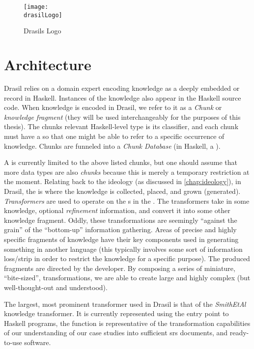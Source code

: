 \begin{figure}[H]
      \centering
      \caption{Drasils Logo}
      \label{fig:drasilLogo}
      \texttt{[image: \\drasilLogo]}
\end{figure}

\drasilPersonification

\section{Architecture}

Drasil relies on a domain expert encoding knowledge as a deeply embedded
 or record in Haskell. Instances of the knowledge also appear in the
Haskell source code. When knowledge is encoded in Drasil, we refer to it as a
\textit{Chunk} or \textit{knowledge fragment} (they will be used interchangeably
for the purposes of this thesis). The chunks relevant Haskell-level type is its
classifier, and each chunk must have a  so that one might be able to
refer to a specific occurrence of knowledge. Chunks are funneled into a
\textit{Chunk Database} (in Haskell, a \ChunkDB{}).


A \ChunkDB{} is currently limited to the above listed chunks, but one should assume that more data types are also
\textit{chunks} because this is merely a temporary restriction at the
moment. Relating back to the ideology (as discussed in
\autoref{chap:ideology}), in Drasil, the \ChunkDB{} is where the knowledge
is collected, placed, and grown (generated). \textit{Transformers} are
used to operate on the \Chunk{}s in the \ChunkDB{}. The transformers take
in some knowledge, optional \textit{refinement} information, and convert
it into some other knowledge fragment. Oddly, these transformations are seemingly ``against the grain'' of
the ``bottom-up'' information gathering. Areas of precise and
highly specific fragments of knowledge have their key components used in
generating something in another language (this typically involves some
sort of information loss/strip in order to restrict the knowledge for a
specific purpose). The produced fragments are directed by the developer.
By composing a series of miniature, ``bite-sized'', transformations, we are
able to create large and highly complex (but well-thought-out and
understood).

The largest, most prominent transformer used in Drasil is that of the
\textit{SmithEtAl} knowledge transformer. It is currently represented using the entry point to Haskell
programs, the  function is representative of the
transformation capabilities of our understanding of our case studies into
sufficient \acs{srs} documents, and ready-to-use software.

